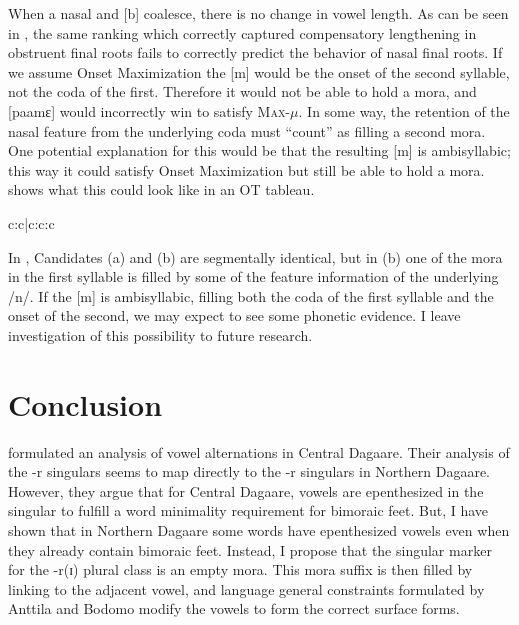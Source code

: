 \documentclass[output=paper,colorlinks,citecolor=brown,
]{langscibook}
\begin{document}
When a nasal and [b] coalesce, there is no change in vowel length. As can be seen in , the same ranking which correctly captured compensatory lengthening in obstruent final roots fails to correctly predict the behavior of nasal final roots. If we assume Onset Maximization \citep{Ito, Selkirk} the [m] would be the onset of the second syllable, not the coda of the first. Therefore it would not be able to hold a mora, and [paamɛ] would incorrectly win to satisfy \textsc{Max}-$\mu$. In some way, the retention of the nasal feature from the underlying coda must ``count'' as filling a second mora. One potential explanation for this would be that the resulting [m] is ambisyllabic; this way it could satisfy Onset Maximization but still be able to hold a mora.  shows what this could look like in an OT tableau.

\begin{table}

  \caption{Tableau deriving [pàmɛ́] `door'}
  \label{tab:Caragine:doors-correct}
  
\begin{tableau}{c:c|c:c:c} 
  \vio{} \vio{*!}  \vio{} \vio{} \vio{*}
 \vio{}  \vio{}  \vio{} \vio{} \vio{*}
 \vio{}\vio{}\vio{*} \vio{} \vio{*}
\end{tableau}
\end{table}

In , Candidates (a) and (b) are segmentally identical, but in (b) one of the mora in the first syllable is filled by some of the feature information of the underlying /n/. If the [m] is ambisyllabic, filling both the coda of the first syllable and the onset of the second, we may expect to see some phonetic evidence. I leave investigation of this possibility to future research.

\section{Conclusion} \label{sec:caragine:conclusion}

\citet{anttilaProsodic2009} formulated an analysis of vowel alternations in Central Dagaare. Their analysis of the -r singulars seems to map directly to the -r singulars in Northern Dagaare. However, they argue that for Central Dagaare, vowels are epenthesized in the singular to fulfill a word minimality requirement for bimoraic feet. But, I have shown that in Northern Dagaare some words have epenthesized vowels even when they already contain bimoraic feet. Instead, I propose that the singular marker for the -r(ɪ) plural class is an empty mora. This mora suffix is then filled by linking to the adjacent vowel, and language general constraints formulated by Anttila and Bodomo modify the vowels to form the correct surface forms.
\end{document}

